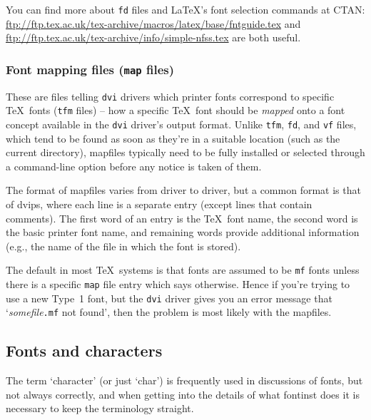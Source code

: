 \documentclass[a4paper]{ltxguide}
\newcommand*{\setfilename}[1]{\texttt{#1}}
\newcommand*{\setpackagename}[1]{\textsf{#1}}
\newcommand{\dvips}   {\setpackagename{dvips}\xspace}
\newcommand{\fontinst}{\setpackagename{font\-inst}\xspace}
\newcommand{\mf} {\setfilename{mf}\xspace}
\newcommand{\vf} {\setfilename{vf}\xspace}
\newcommand{\fd} {\setfilename{fd}\xspace}
\newcommand{\tfm}{\setfilename{tfm}\xspace}
\newcommand{\dvi}{\setfilename{dvi}\xspace}
\newcommand{\map}{\setfilename{map}\xspace}
\begin{document}
You can find more about \fd files and \LaTeX's font selection commands
at CTAN:
\url{ftp://ftp.tex.ac.uk/tex-archive/macros/latex/base/fntguide.tex}
and \url{ftp://ftp.tex.ac.uk/tex-archive/info/simple-nfss.tex} are
both useful.


\subsubsection{Font mapping files (\map files)}

These are files telling \dvi drivers which printer fonts correspond to 
specific \TeX\ fonts (\tfm files) -- how a specific \TeX\ font should 
be \emph{mapped} onto a font concept available in the \dvi driver's 
output format. Unlike \tfm, \fd, and \vf files, 
which tend to be found as soon as they're in a suitable location 
(such as the current directory), mapfiles typically need to be fully 
installed or selected through a command-line option before any notice 
is taken of them.

The format of mapfiles varies from driver to driver, but a common 
format is that of \dvips, where each line is a separate entry (except 
lines that contain comments). The first word of an entry is the 
\TeX~font name, the second word is the basic printer font name, and 
remaining words provide additional information (e.g., the name of the 
file in which the font is stored).

The default in most \TeX\ systems is that fonts are assumed to be \mf 
fonts unless there is a specific \map file entry which says otherwise. 
Hence if you're trying to use a new Type~1 font, but the \dvi driver 
gives you an error message that `\textit{somefile}\texttt{.mf} not 
found', then the problem is most likely with the mapfiles.






\subsection{Fonts and characters}

The term `character' (or just `char') is frequently used in 
discussions of fonts, but not always correctly, and when getting into 
the details of what \fontinst does it is necessary to keep the 
terminology straight.
\end{document}
